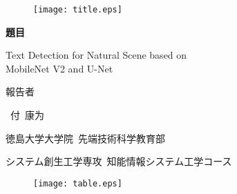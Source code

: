 \documentclass[22pt, UTF8]{article}
\numberwithin{figure}{section}
\numberwithin{table}{section}
\numberwithin{equation}{section} %
\begin{document}
    
\thispagestyle{empty} %
\begin{center}

    \begin{figure}[H]
        \begin{center}
            \texttt{[image: title.eps]}
        \end{center}
    \end{figure}

    \vspace{2mm}
    {\LARGE\bf 題目 \par} 
    {\LARGE \textup Text Detection for Natural Scene based on \\MobileNet V2 and U-Net\par}
    \vspace{10mm}
    {\Large 報告者 \par}
    {\LARGE \ 付\ 康为\par}
    \vspace{10mm}
    {\Large 徳島大学大学院\ 先端技術科学教育部 \par}
    {\Large システム創生工学専攻\ 知能情報システム工学コース \par}
    \vspace{10mm}
        \begin{figure}[H]
    \begin{center}
        \texttt{[image: table.eps]}
    \end{center}
\end{figure}
\end{center}

\makeatother
\end{document}
